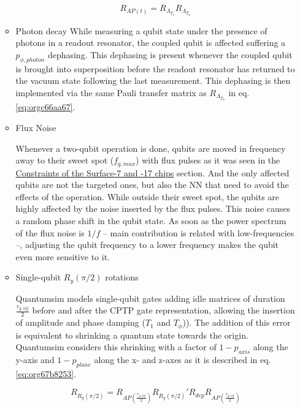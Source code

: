 \begin{itemize}
\begin{itemize}
\begin{equation}
\label{eq:orgc66aa67}
R_{AP (t)} = R_{\Lambda_{T_1}} R_{\Lambda_{T_{\phi}}}
\end{equation}

\item Photon decay
\label{sec:orgab6cad9}
While measuring a qubit state under the presence of photons in a readout resonator, the coupled qubit is affected suffering a \(p_{\phi, photon}\) dephasing.
This dephasing is present whenever the coupled qubit is brought into superposition before the readout resonator has returned to the vacuum state following the last measurement.
This dephasing is then implemented via the same Pauli transfer matrix as \(R_{\Lambda_{T_{\phi}}}\) in eq. \ref{eq:orgc66aa67}.

\item Flux Noise
\label{sec:orgf9c5688}

Whenever a two-qubit operation is done, qubits are moved in frequency away to their sweet spot (\(f_{q,max}\)) with flux pulses as it was seen in the \href{chapter-3.org}{Constraints of the Surface-7 and -17 chips} section.
And the only affected qubits are not the targeted ones, but also the NN that need to avoid the effects of the operation.
While outside their sweet spot, the qubits are highly affected by the noise inserted by the flux pulses.
This noise causes a random phase shift in the qubit state.
As soon as the power spectrum of the flux noise is \(1/f\) -- main contribution is related with low-frequencies --, adjusting the qubit frequency to a lower frequency makes the qubit even more sensitive to it.

\item Single-qubit \(R_y(\pi /2)\) rotations
\label{sec:orgae4ac96}

Quantumsim models single-qubit gates adding idle matrices of duration \(\frac{\tau_{g,1Q}}{2}\) before and after the CPTP gate representation, allowing the insertion of amplitude and phase damping (\(T_1\) and \(T_{\phi}\))).
The addition of this error is equivalent to shrinking a quantum state towards the origin.
Quantumsim considers this shrinking with a factor of \(1 - p_{axis}\) along the y-axis and \(1 - p_{plane}\) along the x- and z-axes as it is described in eq. \ref{eq:org67b8253}.

\begin{equation}
\label{eq:org67b8253}
R_{R_y (\pi /2)} = R_{AP (\frac{\tau_{g,1Q}}{2})} R_{R_y (\pi /2)}' R_{dep} R_{AP (\frac{\tau_{g,1Q}}{2})}
\end{equation}


\end{itemize}
\end{itemize}
